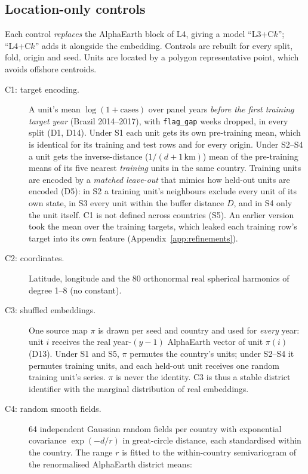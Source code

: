\documentclass[11pt]{article}
\begin{document}
\subsection{Location-only controls}
\label{sec:controls}
Each control \emph{replaces} the AlphaEarth block of L4, giving a model ``L3+C$k$''; ``L4+C$k$'' adds
it alongside the embedding. Controls are rebuilt for every split, fold, origin and seed. Units are
located by a polygon representative point, which avoids offshore centroids.
\begin{description}
  \item[C1: target encoding.] A unit's mean $\log(1+\text{cases})$ over panel years \emph{before the first
  training target year} (Brazil 2014--2017), with \texttt{flag\_gap} weeks dropped, in every split (D1, D14).
  Under S1 each unit gets its own pre-training mean, which is identical for its training and test rows
  and for every origin. Under S2--S4 a unit gets the inverse-distance ($1/(d+1\,\text{km})$) mean of the
  pre-training means of its five nearest \emph{training} units in the same country. Training units are
  encoded by a \emph{matched leave-out} that mimics how held-out units are encoded (D5): in S2 a training
  unit's neighbours exclude every unit of its own state, in S3 every unit within the buffer distance $D$,
  and in S4 only the unit itself. C1 is not defined across countries (S5). An earlier version took the
  mean over the training targets, which leaked each training row's target into its own feature
  (Appendix~\ref{app:refinements}).
  \item[C2: coordinates.] Latitude, longitude and the 80 orthonormal real spherical harmonics of degree
  1--8 (no constant).
  \item[C3: shuffled embeddings.] One source map $\pi$ is drawn per seed and country and used for
  \emph{every} year: unit $i$ receives the real year-$(y-1)$ AlphaEarth vector of unit $\pi(i)$ (D13).
  Under S1 and S5, $\pi$ permutes the country's units; under S2--S4 it permutes training units, and each
  held-out unit receives one random training unit's series. $\pi$ is never the identity. C3 is thus a
  stable district identifier with the marginal distribution of real embeddings.
  \item[C4: random smooth fields.] 64 independent Gaussian random fields per country with exponential
  covariance $\exp(-d/r)$ in great-circle distance, each standardised within the country. The range $r$
  is fitted to the within-country semivariogram of the renormalised AlphaEarth district means:

\end{description}
\end{document}
